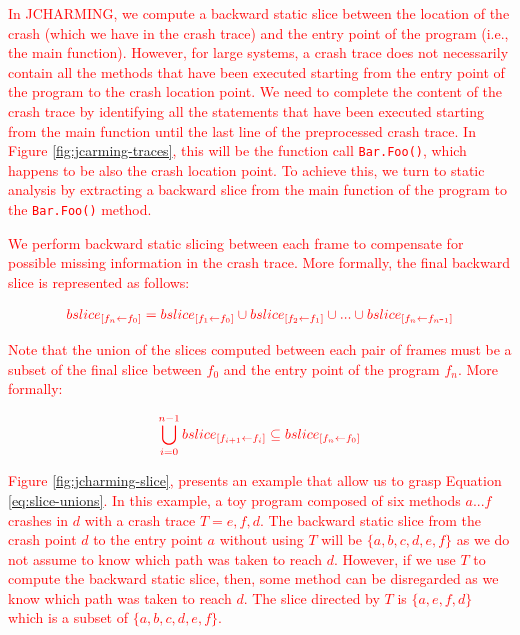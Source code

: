 \documentclass[times, doublespace]{smrauth}
\newcommand{\red}[1]{\textcolor{red}{#1}}
\def\mymathhyphen{{\hbox{-}}}
\begin{document}
\red{In JCHARMING, we compute a backward static slice between the location of the crash (which we have in the crash trace) and the entry point of the program (i.e., the main function). However, for large systems, a crash trace does not necessarily contain all the methods that have been executed starting from the entry point of the program  to the crash
location point. We need to complete the content of the crash
trace by identifying all the statements that have been executed
starting from the main function until the last line of the
preprocessed crash trace. In Figure \ref{fig:jcarming-traces}, this will be the function
call \red{{\tt Bar.Foo()}}, which happens to be also the crash location
point. To achieve this, we turn to static analysis by extracting
a backward slice from the main function of the program to the
\red{{\tt Bar.Foo()}} method.

We perform backward static slicing between each frame to
compensate for possible missing information in the crash
trace. More formally, the final backward slice is
represented as follows:

\begin{equation}
\centering
\begin{split}\red{
bslice_{[f_n \leftarrow f_0]} = bslice_{[f_1 \leftarrow f_0]} \cup bslice_{[f_2 \leftarrow f_1]} \cup ... \cup bslice_{[f_n \leftarrow f_{n\mymathhyphen1}]}}
\end{split}
\end{equation}

Note that the union of the slices computed between each pair
of frames must be a subset of the final slice between $f_0$ and the
entry point of the program $f_n$. More formally:

\begin{equation}
\centering
\begin{split}
  \red{
\bigcup_{i=0}^{n-1} bslice_{[f_{i+1} \leftarrow f_i]} \subseteq bslice_{[f_n \leftarrow f_0]}
  }
\end{split}
\label{eq:slice-unions}
\end{equation}

\red{Figure \ref{fig:jcharming-slice}, presents an example that allow us to grasp Equation \ref{eq:slice-unions}.
In this example, a toy program composed of six methods $a...f$ crashes in $d$ with a crash trace $T = {e, f, d}$.
The backward static slice from the crash point $d$ to the entry point $a$ without using $T$ will be $\{a, b, c, d, e, f\}$ as we do not assume to know which path was taken to reach $d$.
However, if we use $T$ to compute the backward static slice, then, some method can be disregarded as we know which path was taken to reach $d$.
The slice directed by $T$ is $\{a, e, f, d\}$ which is a subset of $\{a, b, c, d, e, f\}$.}

}
\end{document}

